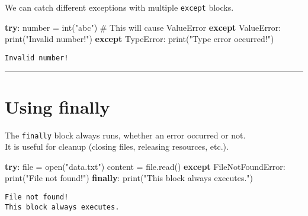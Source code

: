 \documentclass[
  11pt,
  letterpaper,
]{book}
\newenvironment{Shaded}{\begin{snugshade}}{\end{snugshade}}
\newcommand{\BuiltInTok}[1]{\textcolor[rgb]{0.00,0.23,0.31}{#1}}
\newcommand{\CommentTok}[1]{\textcolor[rgb]{0.37,0.37,0.37}{#1}}
\newcommand{\ControlFlowTok}[1]{\textcolor[rgb]{0.00,0.23,0.31}{\textbf{#1}}}
\newcommand{\NormalTok}[1]{\textcolor[rgb]{0.00,0.23,0.31}{#1}}
\newcommand{\OperatorTok}[1]{\textcolor[rgb]{0.37,0.37,0.37}{#1}}
\newcommand{\PreprocessorTok}[1]{\textcolor[rgb]{0.68,0.00,0.00}{#1}}
\newcommand{\StringTok}[1]{\textcolor[rgb]{0.13,0.47,0.30}{#1}}
\begin{document}
We can catch different exceptions with multiple \texttt{except} blocks.

\begin{Shaded}
\begin{Highlighting}[]
\ControlFlowTok{try}\NormalTok{:}
\NormalTok{    number }\OperatorTok{=} \BuiltInTok{int}\NormalTok{(}\StringTok{"abc"}\NormalTok{)   }\CommentTok{\# This will cause ValueError}
\ControlFlowTok{except} \PreprocessorTok{ValueError}\NormalTok{:}
    \BuiltInTok{print}\NormalTok{(}\StringTok{"Invalid number!"}\NormalTok{)}
\ControlFlowTok{except} \PreprocessorTok{TypeError}\NormalTok{:}
    \BuiltInTok{print}\NormalTok{(}\StringTok{"Type error occurred!"}\NormalTok{)}
\end{Highlighting}
\end{Shaded}

\begin{verbatim}
Invalid number!
\end{verbatim}

\begin{center}\rule{0.5\linewidth}{0.5pt}\end{center}

\section{Using finally}\label{using-finally}

The \texttt{finally} block always runs, whether an error occurred or
not.\\
It is useful for cleanup (closing files, releasing resources, etc.).

\begin{Shaded}
\begin{Highlighting}[]
\ControlFlowTok{try}\NormalTok{:}
    \BuiltInTok{file} \OperatorTok{=} \BuiltInTok{open}\NormalTok{(}\StringTok{"data.txt"}\NormalTok{)}
\NormalTok{    content }\OperatorTok{=} \BuiltInTok{file}\NormalTok{.read()}
\ControlFlowTok{except} \PreprocessorTok{FileNotFoundError}\NormalTok{:}
    \BuiltInTok{print}\NormalTok{(}\StringTok{"File not found!"}\NormalTok{)}
\ControlFlowTok{finally}\NormalTok{:}
    \BuiltInTok{print}\NormalTok{(}\StringTok{"This block always executes."}\NormalTok{)}
\end{Highlighting}
\end{Shaded}

\begin{verbatim}
File not found!
This block always executes.
\end{verbatim}
\end{document}
